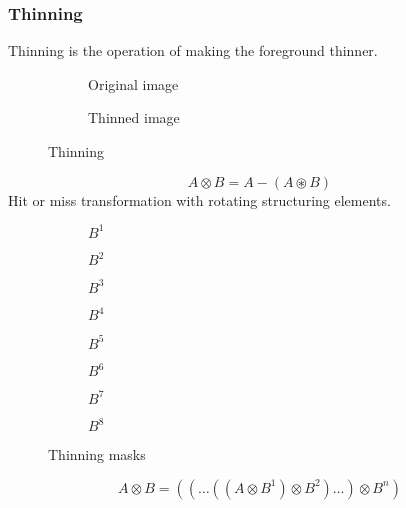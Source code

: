 \subsubsection{Thinning}
Thinning is the operation of making the foreground thinner.
\begin{figure}[h]
	\centering
	\begin{subfigure}[b]{0.45\textwidth}
		\centering
		\caption{Original image}
	\end{subfigure}
	\begin{subfigure}[b]{0.45\textwidth}
		\centering
		\caption{Thinned image}
	\end{subfigure}
	\caption{Thinning}
\end{figure}
	\[
		A \otimes  B = A - (A \circledast B)	
	\]	
Hit or miss transformation with rotating structuring elements.\\

\begin{figure}[h]
	\centering
	\begin{subfigure}[b]{0.1\textwidth}
		\centering
		\caption{$B^1$}
	\end{subfigure}
	\begin{subfigure}[b]{0.1\textwidth}
		\centering
		\caption{$B^2$}
	\end{subfigure}
	\begin{subfigure}[b]{0.1\textwidth}
		\centering
		\caption{$B^3$}
	\end{subfigure}
	\begin{subfigure}[b]{0.1\textwidth}
		\centering
		\caption{$B^4$}
	\end{subfigure}
	\begin{subfigure}[b]{0.1\textwidth}
		\centering
		\caption{$B^5$}
	\end{subfigure}
	\begin{subfigure}[b]{0.1\textwidth}
		\centering
		\caption{$B^6$}
	\end{subfigure}
	\begin{subfigure}[b]{0.1\textwidth}
		\centering
		\caption{$B^7$}
	\end{subfigure}
	\begin{subfigure}[b]{0.1\textwidth}
		\centering
		\caption{$B^8$}
	\end{subfigure}
	\caption{Thinning masks}
\end{figure}
	\[
		A \otimes  {B} = ((\ldots((A \otimes B^{1}) \otimes B^{2})\ldots) \otimes B^{n})	
	\]	

